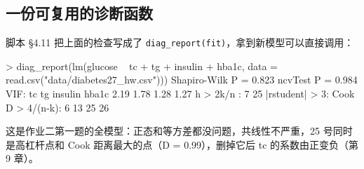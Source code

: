 \subsection{一份可复用的诊断函数}
脚本 §4.11 把上面的检查写成了 \Verb|diag_report(fit)|，拿到新模型可以直接调用：

\begin{ROut}
> diag_report(lm(glucose ~ tc + tg + insulin + hba1c, data = read.csv("data/diabetes27_hw.csv")))
Shapiro-Wilk P = 0.823
ncvTest P      = 0.984
VIF:
     tc      tg insulin   hba1c
   2.19    1.78    1.28    1.27
h > 2k/n      : 7 25
|rstudent| > 3:
Cook D > 4/(n-k): 6 13 25 26
\end{ROut}
这是作业二第一题的全模型：正态和等方差都没问题，共线性不严重，25 号同时是高杠杆点和 Cook 距离最大的点（D = 0.99），删掉它后 tc 的系数由正变负（第 9 章）。
